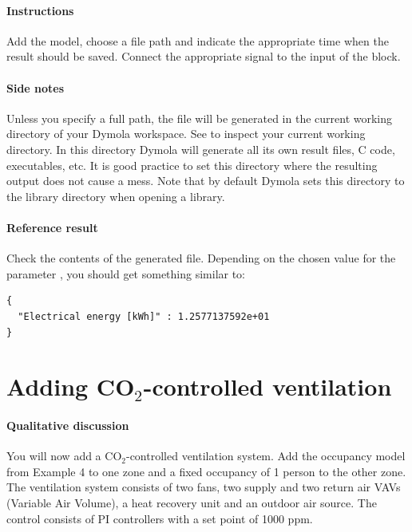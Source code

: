\documentclass[10pt,a4paper]{article}
\begin{document}
\paragraph{Instructions}
Add the model, choose a file path and indicate the appropriate time when 
the result should be saved.
Connect the appropriate signal to the input of the block.

\paragraph{Side notes}
Unless you specify a full path, the file will be generated in
the current working directory of your Dymola workspace.
See  to inspect your current
working directory.
In this directory Dymola will generate all its own result files, C code, executables, etc.
It is good practice to set this directory where the resulting output does not cause a mess.
Note that by default Dymola sets this directory to the library directory when opening a library.

\paragraph{Reference result}
Check the contents of the generated file. 
Depending on the chosen value for the parameter , 
you should get something similar to:
\begin{verbatim}
{
  "Electrical energy [kWh]" : 1.2577137592e+01
}
\end{verbatim}

\newpage

\section{Adding CO$_2$-controlled ventilation}
\paragraph{Qualitative discussion}
You will now add a CO$_2$-controlled ventilation system.
Add the occupancy model from Example 4 to one zone
and a fixed occupancy of 1 person to the other zone.
The ventilation system consists of two fans, two supply and two return air
VAVs (Variable Air Volume), a heat recovery unit and an outdoor air source.
The control consists of PI controllers with a set point of 1000 ppm.
\end{document}
